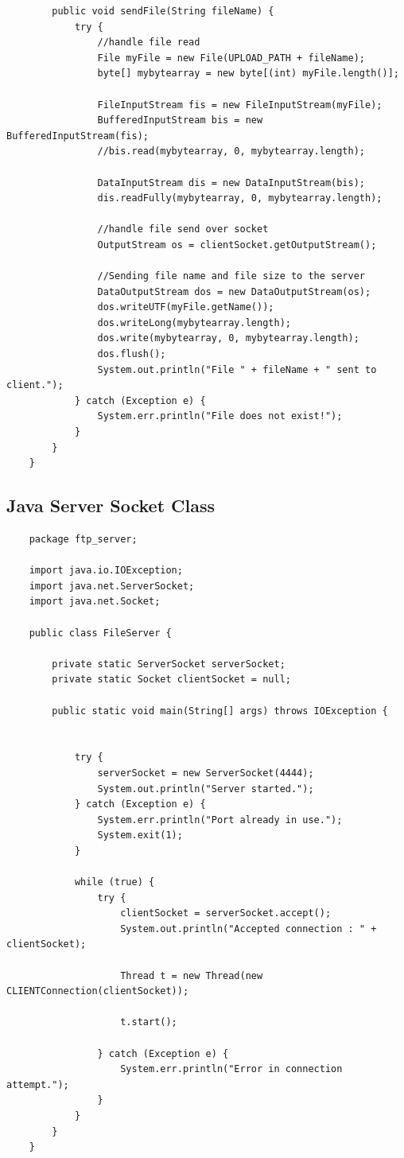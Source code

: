 \documentclass[12pt]{article}
\begin{document}
\begin{verbatim}
		public void sendFile(String fileName) {
			try {
				//handle file read
				File myFile = new File(UPLOAD_PATH + fileName);
				byte[] mybytearray = new byte[(int) myFile.length()];
	
				FileInputStream fis = new FileInputStream(myFile);
				BufferedInputStream bis = new BufferedInputStream(fis);
				//bis.read(mybytearray, 0, mybytearray.length);
	
				DataInputStream dis = new DataInputStream(bis);
				dis.readFully(mybytearray, 0, mybytearray.length);
	
				//handle file send over socket
				OutputStream os = clientSocket.getOutputStream();
	
				//Sending file name and file size to the server
				DataOutputStream dos = new DataOutputStream(os);
				dos.writeUTF(myFile.getName());
				dos.writeLong(mybytearray.length);
				dos.write(mybytearray, 0, mybytearray.length);
				dos.flush();
				System.out.println("File " + fileName + " sent to client.");
			} catch (Exception e) {
				System.err.println("File does not exist!");
			}
		}
	}
\end{verbatim}

\subsection{Java Server Socket Class}
\begin{verbatim}
	package ftp_server;

	import java.io.IOException;
	import java.net.ServerSocket;
	import java.net.Socket;
	
	public class FileServer {
	
		private static ServerSocket serverSocket;
		private static Socket clientSocket = null;
	
		public static void main(String[] args) throws IOException {
	
	
			try {
				serverSocket = new ServerSocket(4444);
				System.out.println("Server started.");
			} catch (Exception e) {
				System.err.println("Port already in use.");
				System.exit(1);
			}
	
			while (true) {
				try {
					clientSocket = serverSocket.accept();
					System.out.println("Accepted connection : " + clientSocket);
	
					Thread t = new Thread(new CLIENTConnection(clientSocket));
	
					t.start();
	
				} catch (Exception e) {
					System.err.println("Error in connection attempt.");
				}
			}
		}
	}
\end{verbatim}
\end{document}

